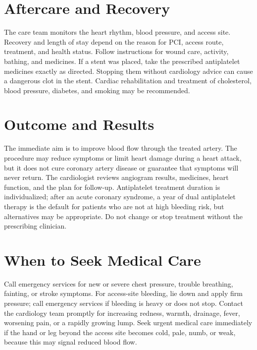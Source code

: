 \section*{Aftercare and Recovery}
The care team monitors the heart rhythm, blood pressure, and access site. Recovery and length of stay depend on the reason for PCI, access route, treatment, and health status. Follow instructions for wound care, activity, bathing, and medicines. If a stent was placed, take the prescribed antiplatelet medicines exactly as directed. Stopping them without cardiology advice can cause a dangerous clot in the stent. Cardiac rehabilitation and treatment of cholesterol, blood pressure, diabetes, and smoking may be recommended.

\section*{Outcome and Results}
The immediate aim is to improve blood flow through the treated artery. The procedure may reduce symptoms or limit heart damage during a heart attack, but it does not cure coronary artery disease or guarantee that symptoms will never return. The cardiologist reviews angiogram results, medicines, heart function, and the plan for follow-up. Antiplatelet treatment duration is individualized; after an acute coronary syndrome, a year of dual antiplatelet therapy is the default for patients who are not at high bleeding risk, but alternatives may be appropriate. Do not change or stop treatment without the prescribing clinician.

\section*{When to Seek Medical Care}
Call emergency services for new or severe chest pressure, trouble breathing, fainting, or stroke symptoms. For access-site bleeding, lie down and apply firm pressure; call emergency services if bleeding is heavy or does not stop. Contact the cardiology team promptly for increasing redness, warmth, drainage, fever, worsening pain, or a rapidly growing lump. Seek urgent medical care immediately if the hand or leg beyond the access site becomes cold, pale, numb, or weak, because this may signal reduced blood flow.

